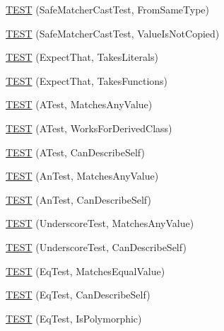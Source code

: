 \begin{DoxyCompactItemize}
\mbox{\hyperlink{namespacetesting_1_1gmock__matchers__test_a9fc149b429176a45e45267132ae901bd}{T\+E\+ST}} (Safe\+Matcher\+Cast\+Test, From\+Same\+Type)
\item 
\mbox{\hyperlink{namespacetesting_1_1gmock__matchers__test_ac82f8355af7a1e6ba3b67ba8423a1d73}{T\+E\+ST}} (Safe\+Matcher\+Cast\+Test, Value\+Is\+Not\+Copied)
\item 
\mbox{\hyperlink{namespacetesting_1_1gmock__matchers__test_a7672c72f955b937542acd87d18dd7ea6}{T\+E\+ST}} (Expect\+That, Takes\+Literals)
\item 
\mbox{\hyperlink{namespacetesting_1_1gmock__matchers__test_aafaf5273bd3d8ba273a5dd243d3a52ba}{T\+E\+ST}} (Expect\+That, Takes\+Functions)
\item 
\mbox{\hyperlink{namespacetesting_1_1gmock__matchers__test_af15da53cdc65283b8ca688a03801fd12}{T\+E\+ST}} (A\+Test, Matches\+Any\+Value)
\item 
\mbox{\hyperlink{namespacetesting_1_1gmock__matchers__test_a2b2dfb85d18883b07f7d13d21abee2fc}{T\+E\+ST}} (A\+Test, Works\+For\+Derived\+Class)
\item 
\mbox{\hyperlink{namespacetesting_1_1gmock__matchers__test_a24432bc861bee430fb8ac1a4e5463ecf}{T\+E\+ST}} (A\+Test, Can\+Describe\+Self)
\item 
\mbox{\hyperlink{namespacetesting_1_1gmock__matchers__test_a15bf6771986d1e9f675f29861f7551c1}{T\+E\+ST}} (An\+Test, Matches\+Any\+Value)
\item 
\mbox{\hyperlink{namespacetesting_1_1gmock__matchers__test_ac3b18688ca5b5cf2d6137ce3e7397691}{T\+E\+ST}} (An\+Test, Can\+Describe\+Self)
\item 
\mbox{\hyperlink{namespacetesting_1_1gmock__matchers__test_a3fc77fa5ca709ef70963026fd7114552}{T\+E\+ST}} (Underscore\+Test, Matches\+Any\+Value)
\item 
\mbox{\hyperlink{namespacetesting_1_1gmock__matchers__test_a25ae831c15c9ca918ed847ba147ac572}{T\+E\+ST}} (Underscore\+Test, Can\+Describe\+Self)
\item 
\mbox{\hyperlink{namespacetesting_1_1gmock__matchers__test_a2ac5d4c2fae3e7f2e6c6be657a61f86a}{T\+E\+ST}} (Eq\+Test, Matches\+Equal\+Value)
\item 
\mbox{\hyperlink{namespacetesting_1_1gmock__matchers__test_a1c86e845cb44f34eeac4863041c871c6}{T\+E\+ST}} (Eq\+Test, Can\+Describe\+Self)
\item 
\mbox{\hyperlink{namespacetesting_1_1gmock__matchers__test_ac3ea755ba2a8bb480cee70aa37ccafc2}{T\+E\+ST}} (Eq\+Test, Is\+Polymorphic)
\item 

\end{DoxyCompactItemize}
